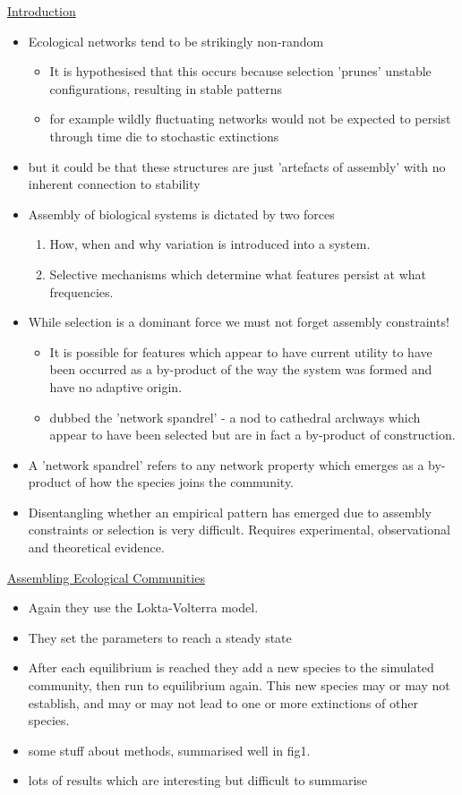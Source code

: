 \documentclass[11pt]{article}
\begin{document}
	\underline{Introduction}
	\begin{itemize}
		\item Ecological networks tend to be strikingly non-random
		\begin{itemize}
			\item It is hypothesised that this occurs because selection 'prunes' unstable configurations, resulting in stable patterns
			\item for example wildly fluctuating networks would not be expected to persist through time die to stochastic extinctions
		\end{itemize}
		\item but it could be that these structures are just 'artefacts of assembly' with no inherent connection to stability
		\item Assembly of biological systems is dictated by two forces
		\begin{enumerate}
			\item How, when and why variation is introduced into a system.
			\item Selective mechanisms which determine what features persist at what frequencies. 
		\end{enumerate}
		\item While selection is a dominant force we must not forget assembly constraints!
		\begin{itemize}
			\item It is possible for features which appear to have current utility to have been occurred as a by-product of the way the system was formed and have no adaptive origin.
			\item dubbed the 'network spandrel' - a nod to cathedral archways which appear to have been selected but are in fact a by-product of construction.
		\end{itemize}
		\item A 'network spandrel' refers to any network property which emerges as a by-product of how the species joins the community.
		\item Disentangling whether an empirical pattern has emerged due to assembly constraints or selection is very difficult. Requires experimental, observational and theoretical evidence.
	\end{itemize}

	\underline{Assembling Ecological Communities}
	\begin{itemize}
		\item Again they use the Lokta-Volterra model.
		\item They set the parameters to reach a steady state
		\item After each equilibrium is reached they add a new species to the simulated community, then run to equilibrium again. This new species may or may not establish, and may or may not lead to one or more extinctions of other species.
		\item some stuff about methods, summarised well in fig1.
		\item lots of results which are interesting but difficult to summarise
	\end{itemize}
	
\end{document}
